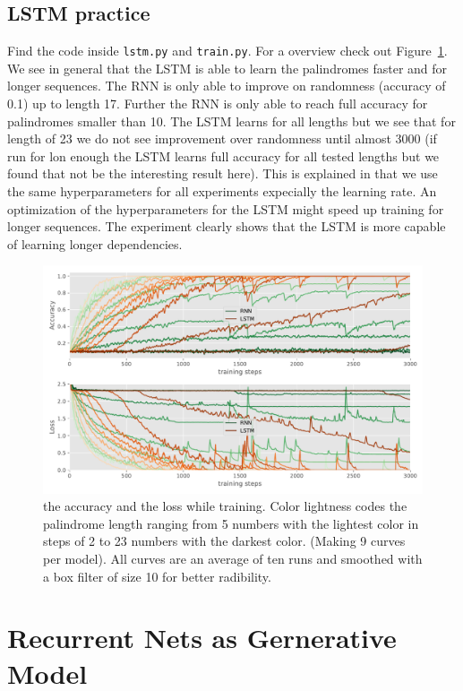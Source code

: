 \documentclass{article}
\begin{document}
\subsection{LSTM practice}\label{sub:lstm_practice}
Find the code inside \texttt{lstm.py} and \texttt{train.py}.
For a overview check out Figure~\ref{fig:accuracy_loss}.
We see in general that the LSTM is able to learn the palindromes faster and for longer sequences.
The RNN is only able to improve on randomness (accuracy of 0.1) up to length 17.
Further the RNN is only able to reach full accuracy for palindromes smaller than 10.
The LSTM learns for all lengths but we see that for length of 23 we do not see improvement over randomness until almost 3000
(if run for lon enough the LSTM learns full accuracy for all tested lengths but we found that not be the interesting result here).
This is explained in that we use the same hyperparameters for all experiments expecially the learning rate.
An optimization of the hyperparameters for the LSTM might speed up training for longer sequences.
The experiment clearly shows that the LSTM is more capable of learning longer dependencies.

\begin{figure}
  \centering
  \includegraphics[width=\linewidth]{assignment_2/part1/palindrome.pdf}
  \caption{ the accuracy and  the loss while training.
  Color lightness codes the palindrome length ranging from 5 numbers with the lightest color in steps of 2 to 23 numbers with the darkest color.
  (Making 9 curves per model). All curves are an average of ten runs and smoothed with a box filter of size 10 for better radibility.}\label{fig:accuracy_loss}
\end{figure}

\section{Recurrent Nets as Gernerative Model}
\end{document}
